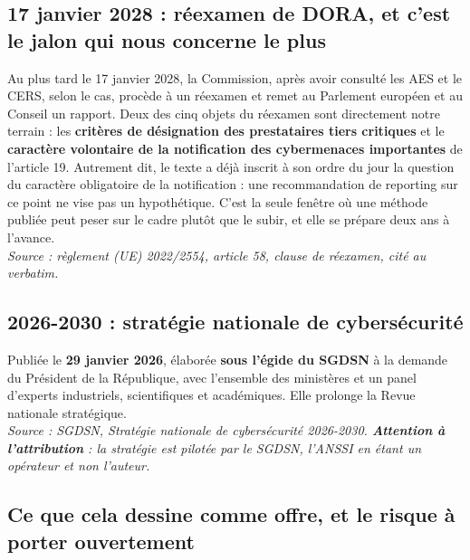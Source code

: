 \documentclass[11pt,a4paper]{article}
\newcommand{\src}[1]{{\footnotesize\itshape\textcolor{bleu}{Source : #1}}}
\begin{document}
\subsection{17 janvier 2028 : réexamen de DORA, et c'est le jalon qui nous concerne le plus}
\og{}Au plus tard le 17 janvier 2028, la Commission, après avoir consulté les AES et le CERS,
selon le cas, procède à un réexamen et remet au Parlement européen et au Conseil un rapport\fg{}.
Deux des cinq objets du réexamen sont directement notre terrain : les \textbf{critères de
désignation des prestataires tiers critiques} et le \textbf{caractère volontaire de la
notification des cybermenaces importantes} de l'article 19. Autrement dit, le texte a déjà
inscrit à son ordre du jour la question du caractère obligatoire de la notification : une
recommandation de reporting sur ce point ne vise pas un hypothétique. C'est la seule fenêtre où
une méthode publiée peut peser sur le cadre plutôt que le subir, et elle se prépare deux ans à
l'avance. \\
\src{règlement (UE) 2022/2554, article 58, clause de réexamen, cité au verbatim.}

\subsection{2026-2030 : stratégie nationale de cybersécurité}
Publiée le \textbf{29 janvier 2026}, élaborée \textbf{sous l'égide du SGDSN} à la demande du
Président de la République, avec l'ensemble des ministères et un panel d'experts industriels,
scientifiques et académiques. Elle prolonge la Revue nationale stratégique. \\
\src{SGDSN, Stratégie nationale de cybersécurité 2026-2030. \textbf{Attention à l'attribution} :
la stratégie est pilotée par le SGDSN, l'ANSSI en étant un opérateur et non l'auteur.}

\subsection{Ce que cela dessine comme offre, et le risque à porter ouvertement}
\end{document}
